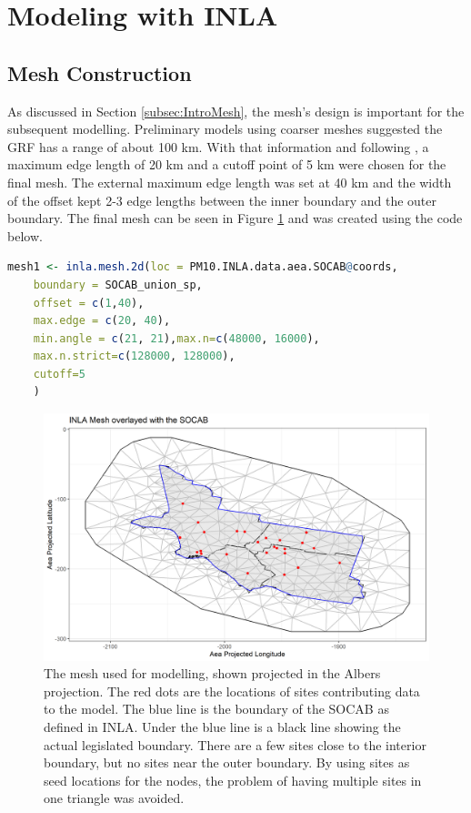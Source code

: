%
\section{Modeling with INLA}
\label{subsec:INLAmodelling}

\subsection{Mesh Construction}
As discussed in Section \ref{subsec:IntroMesh}, the mesh's design is important for the subsequent modelling.  Preliminary models using coarser meshes suggested the \ac{GRF} has a range of about 100 km.   With that information and following \cite{Righetto2020}, a maximum edge length of 20 km and a cutoff point of 5 km were chosen for the final mesh.  The external maximum edge length was set at 40 km and the width of the offset kept 2-3 edge lengths between the inner boundary and the outer boundary.  The final mesh can be seen in Figure \ref{fig:SOCAB_mesh} and was created using the code below.

\begin{lstlisting}[language = R]
	mesh1 <- inla.mesh.2d(loc = PM10.INLA.data.aea.SOCAB@coords, 
	boundary = SOCAB_union_sp,
	offset = c(1,40),
	max.edge = c(20, 40),
	min.angle = c(21, 21),max.n=c(48000, 16000), 
	max.n.strict=c(128000, 128000), 
	cutoff=5
	) 
\end{lstlisting} \label{code:inlaMesh}

\begin{figure}[ht]
	\centering
	\includegraphics[width = \textwidth]{Figures/SOCAB_mesh.png}
	\caption{The mesh used for modelling, shown projected in the Albers projection.  The red dots are the locations of sites contributing data to the model.  The blue line is the boundary of the \ac{SOCAB} as defined in \ac{INLA}.  Under the blue line is a black line showing the actual legislated boundary.  There are a few sites close to the interior boundary, but no sites near the outer boundary.  By using sites as seed locations for the nodes, the problem of having multiple sites in one triangle was avoided.}
	\label{fig:SOCAB_mesh}
\end{figure}

